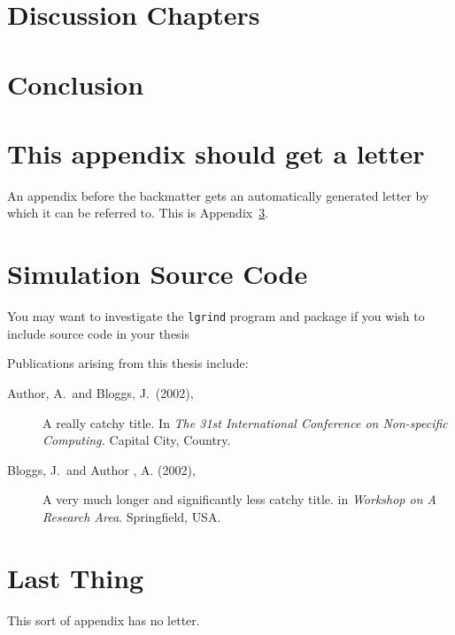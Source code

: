 \documentclass[a4paper,11pt,bcshonoursthesis,singlespace,twoside]{cssethesis}
\begin{document}
\chapter{Discussion Chapters}

\chapter{Conclusion}

\appendix %


\chapter{This appendix should get a letter}
\label{app:example}
An appendix before the backmatter gets an automatically generated letter by
which it can be referred to. This is Appendix~\ref{app:example}.

\chapter{Simulation Source Code}
You may want to investigate the \texttt{lgrind} program and package if you
wish to include source code in your thesis


\backmatter						%
\begin{thesisauthorvita}
\begin{spacing}{1}
Publications arising from this thesis include:
\begin{description}
\item[Author, A.\ and Bloggs, J.\ (2002),]
A really catchy title. In \emph{The 31st International Conference
on Non-specific Computing.} Capital City, Country.
\item[Bloggs, J.\ and Author , A. (2002),]
A very much longer and significantly less catchy title. in \emph {Workshop on
A Research Area}. Springfield, USA.
\end{description}
\end{spacing}
\end{thesisauthorvita}


\chapter{Last Thing} %
This sort of appendix has no letter. 
\end{document}
